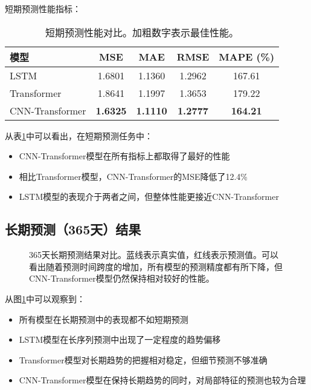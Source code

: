 \documentclass[a4paper,11pt]{article}
\begin{document}
短期预测性能指标：
\begin{table}[htbp]
\centering
\begin{tabular}{lcccc}
\toprule
模型 & MSE & MAE & RMSE & MAPE (\%) \\
\midrule
LSTM & 1.6801 & 1.1360 & 1.2962 & 167.61 \\
Transformer & 1.8641 & 1.1997 & 1.3653 & 179.22 \\
CNN-Transformer & \textbf{1.6325} & \textbf{1.1110} & \textbf{1.2777} & \textbf{164.21} \\
\bottomrule
\end{tabular}
\caption{短期预测性能对比。加粗数字表示最佳性能。}
\label{tab:short_term}
\end{table}

从表\ref{tab:short_term}中可以看出，在短期预测任务中：
\begin{itemize}
    \item CNN-Transformer模型在所有指标上都取得了最好的性能
    \item 相比Transformer模型，CNN-Transformer的MSE降低了12.4\%
    \item LSTM模型的表现介于两者之间，但整体性能更接近CNN-Transformer
\end{itemize}

\subsection{长期预测（365天）结果}
\begin{figure}[htbp]
\centering
{}
\caption{365天长期预测结果对比。蓝线表示真实值，红线表示预测值。可以看出随着预测时间跨度的增加，所有模型的预测精度都有所下降，但CNN-Transformer模型仍然保持相对较好的性能。}
\label{fig:long_term}
\end{figure}

从图\ref{fig:long_term}中可以观察到：
\begin{itemize}
    \item 所有模型在长期预测中的表现都不如短期预测
    \item LSTM模型在长序列预测中出现了一定程度的趋势偏移
    \item Transformer模型对长期趋势的把握相对稳定，但细节预测不够准确
    \item CNN-Transformer模型在保持长期趋势的同时，对局部特征的预测也较为合理
\end{itemize}
\end{document}
